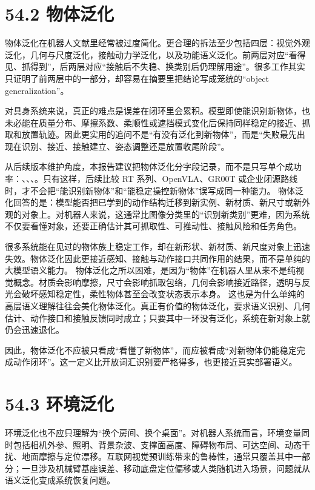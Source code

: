 \section*{54.2 物体泛化}


物体泛化在机器人文献里经常被过度简化。更合理的拆法至少包括四层：视觉外观泛化，几何与尺度泛化，接触动力学泛化，以及功能语义泛化。前两层对应“看得见、抓得到”，后两层对应“接触后不失稳、换类别后仍理解用途”。很多工作其实只证明了前两层中的一部分，却容易在摘要里把结论写成笼统的“object generalization”。

对具身系统来说，真正的难点是误差在闭环里会累积。模型即使能识别新物体，也未必能在质量分布、摩擦系数、柔顺性或遮挡模式变化后保持同样稳定的接近、抓取和放置轨迹。因此更实用的追问不是“有没有泛化到新物体”，而是“失败最先出现在识别、接近、接触建立、姿态调整还是放置收尾阶段”。

从后续版本维护角度，本报告建议把物体泛化分字段记录，而不是只写单个成功率：\texttt{}、\texttt{}、、\texttt{}。只有这样，后续比较 RT 系列、OpenVLA、GR00T 或企业闭源路线时，才不会把“能识别新物体”和“能稳定操控新物体”误写成同一种能力。 物体泛化回答的是：模型能否把已学到的动作结构迁移到新实例、新材质、新尺寸或新外观的对象上。对机器人来说，这通常比图像分类里的“识别新类别”更难，因为系统不仅要看懂对象，还要正确估计其可抓取性、可推动性、接触风险和任务角色。

很多系统能在见过的物体族上稳定工作，却在新形状、新材质、新尺度对象上迅速失效。物体泛化因此更接近感知、接触与动作接口共同作用的结果，而不是单纯的大模型语义能力。 物体泛化之所以困难，是因为“物体”在机器人里从来不是纯视觉概念。材质会影响摩擦，尺寸会影响抓取包络，几何会影响接近路径，透明与反光会破坏感知稳定性，柔性物体甚至会改变状态表示本身。 这也是为什么单纯的高层语义理解往往会美化物体泛化。真正有价值的物体泛化，要求语义识别、几何估计、动作接口和接触反馈同时成立；只要其中一环没有泛化，系统在新对象上就仍会迅速退化。

因此，物体泛化不应被只看成“看懂了新物体”，而应被看成“对新物体仍能稳定完成动作闭环”。这一定义比开放词汇识别要严格得多，也更接近真实部署语义。

\section*{54.3 环境泛化}


环境泛化也不应只理解为“换个房间、换个桌面”。对机器人系统而言，环境变量同时包括相机外参、照明、背景杂波、支撑面高度、障碍物布局、可达空间、动态干扰、地面摩擦与定位漂移。互联网视觉预训练带来的鲁棒性，通常只覆盖其中一部分；一旦涉及机械臂基座误差、移动底盘定位偏移或人类随机进入场景，问题就从语义泛化变成系统恢复问题。

